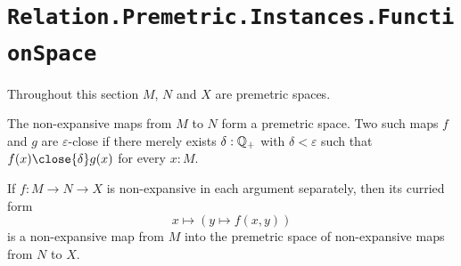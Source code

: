 \section{\texttt{Relation.Premetric.Instances.FunctionSpace}}

Throughout this section $M$, $N$ and $X$ are premetric spaces.

\begin{definition}
  \label{NEPrSpace}
  The non-expansive maps from $M$ to $N$ form a premetric space. Two such maps $f$ and $g$ are $\varepsilon$-close if there merely exists $\delta : \mathbb{Q}_{+}$ with $\delta < \varepsilon$ such that $f(x) \close{\delta} g(x)$ for every $x : M$.
\end{definition}

\begin{lemma}
  \label{makeNE2}
  If $f \colon M \to N \to X$ is non-expansive in each argument separately, then its curried form
  \[
    x \mapsto (y \mapsto f(x,y))
  \]
  is a non-expansive map from $M$ into the premetric space of non-expansive maps from $N$ to $X$.
\end{lemma}
